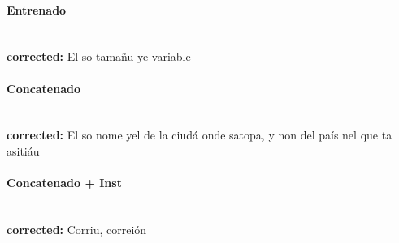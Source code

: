 \paragraph{Entrenado}~\\
\textbf{corrected:} El so tamañu ye variable

\paragraph{Concatenado}~\\
\textbf{corrected:} El so nome ye\textquotesingle{}l de la ciudá onde s\textquotesingle{}atopa, y non del país nel que ta asitiáu

\paragraph{Concatenado + Inst}~\\
\textbf{corrected:} Corriu, correión